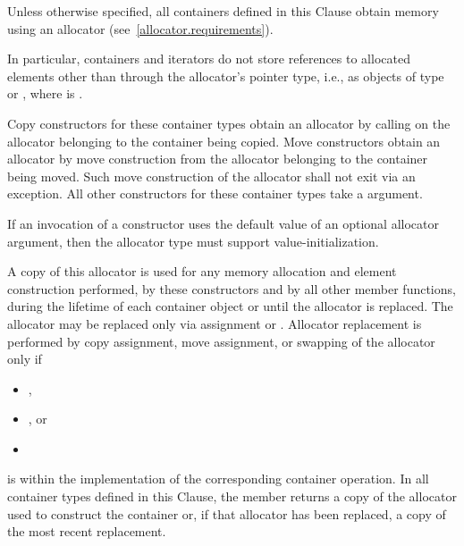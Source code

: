 \pnum
Unless otherwise specified, all containers defined in this Clause obtain memory
using an allocator (see~\ref{allocator.requirements}).
\begin{note}
In particular, containers and iterators do not store references
to allocated elements other than through the allocator's pointer type,
i.e., as objects of type  or
,
where  is .
\end{note}
Copy constructors for these container types obtain an allocator by calling
on the allocator belonging to the container being copied.
Move constructors obtain an allocator by move construction from the allocator belonging to
the container being moved. Such move construction of the allocator shall not exit via an
exception.
All other constructors for these container types take a
 argument.
\begin{note}
If an invocation of a constructor uses the default value of an optional
allocator argument, then the allocator type must support value-initialization.
\end{note}
A copy of this allocator is used for any memory allocation and element construction
performed, by these constructors and by all other member functions,
during the lifetime of each container object
or until the allocator is replaced. The allocator may be replaced only via assignment or
. Allocator replacement is performed by
copy assignment, move assignment, or swapping of the allocator only if
\begin{itemize}
\item {},
\item {},
or
\item {}
\end{itemize}
is 
within the implementation of the corresponding container operation.
In all container types defined in this Clause, the member 
returns a copy of the allocator used to construct the container or, if that allocator
has been replaced, a copy of the most recent replacement.

